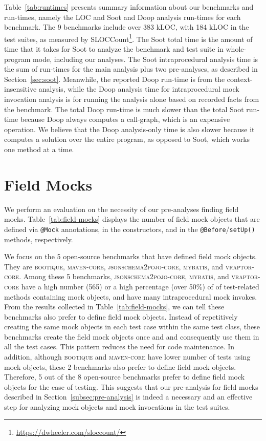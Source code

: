 Table~\ref{tab:runtimes} presents summary information about our benchmarks and run-times, namely the LOC and Soot and Doop analysis run-times for each benchmark. The 9 benchmarks include over 383 kLOC, with 184 kLOC in the test suites, as measured by SLOCCount\footnote{\url{https://dwheeler.com/sloccount/}}. The Soot total time is the amount of time that it takes for Soot to analyze the benchmark and test suite in whole-program mode, including our analyses. The Soot intraprocedural analysis time is the sum of run-times for the main analysis plus two pre-analyses, as described in Section~\ref{sec:soot}. Meanwhile, the reported Doop run-time is from the context-insensitive analysis, while the Doop analysis time for intraprocedural mock invocation analysis is for running the analysis alone based on recorded facts from the benchmark. The total Doop run-time is much slower than the total Soot run-time because Doop always computes a call-graph, which is an expensive operation. We believe that the Doop analysis-only time is also slower because it computes a solution over the entire program, as opposed to Soot, which works one method at a time.

\section{Field Mocks}

We perform an evaluation on the necessity of our pre-analyses finding field mocks. 
Table~\ref{tab:field-mocks} displays the number of field mock objects that are defined via \texttt{@Mock} annotations, in the constructors, and in the \texttt{@Before}/\texttt{setUp()} methods, respectively. 

We focus on the 5 open-source benchmarks that have defined field mock objects. They are \textsc{bootique}, \textsc{maven-core}, \textsc{jsonschema2pojo-core}, \textsc{mybatis}, and \textsc{vraptor-core}. Among these 5 benchmarks, \textsc{jsonschema2pojo-core}, \textsc{mybatis}, and \textsc{vraptor-core} have a high number (565) or a high percentage (over 50\%) of of test-related methods containing mock objects, and have many intraprocedural mock invokes. From the results collected in Table~\ref{tab:field-mocks}, we can tell these benchmarks also prefer to define field mock objects. Instead of repetitively creating the same mock objects in each test case within the same test class, these benchmarks create the field mock objects once and and consequently use them in all the test cases. This pattern reduces the need for code maintenance. In addition, although \textsc{bootique} and \textsc{maven-core} have lower number of tests using mock objects, these 2 benchmarks also prefer to define field mock objects. Therefore, 5 out of the 8 open-source benchmarks prefer to define field mock objects for the ease of testing. This suggests that our pre-analysis for field mocks described in Section~\ref{subsec:pre-analysis} is indeed a necessary and an effective step for analyzing mock objects and mock invocations in the test suites.

